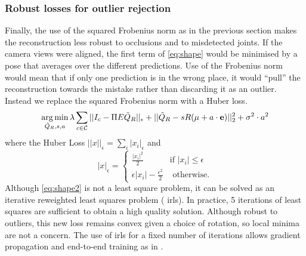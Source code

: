 \documentclass[10pt,twocolumn,letterpaper]{article}
\DeclareMathOperator*{\argmin}{arg\,min}
\newcommand{\rec}{Q}
\begin{document}
\subsubsection{Robust losses for outlier rejection}
Finally, the use of the squared Frobenius norm as in the previous section makes the
reconstruction less robust to occlusions and to misdetected joints. If the
camera views were aligned, the first term of \eqref{eq:shape} would be minimised
by a pose that averages over the different predictions. Use of the Frobenius
norm would  mean
that if only one prediction is in the wrong place, it would ``pull'' the
reconstruction towards the mistake rather than discarding it as an outlier.
Instead we replace the squared Frobenius norm with a Huber loss.
\begin{equation}
 \argmin_{\tilde\rec_R,s,a} \lambda \sum_{c\in \cal C} ||I_c -\Pi E \tilde\rec_R ||_\epsilon + ||\tilde\rec_R - s R (\mu + a \cdot {\bf e})||_2^2 +\sigma^2 \cdot a^2
 \label{eq:shape2}
\end{equation}
where the Huber Loss $||x||_\epsilon=\sum_i |x_i|_\epsilon$ and 
\begin{equation}
 |x|_\epsilon =\begin{cases}
 \frac{|x_i|^2}{2} &\text{if $|x_i|\leq \epsilon$}\\
 \epsilon |x_i| - \frac{\epsilon^2}{2}&\text{ otherwise.}
 \end{cases}
\end{equation}
Although \eqref{eq:shape2} is not  a least square
problem, it can be solved as an iterative reweighted least squares problem ({\sc
irls}). In
practice, 5 iterations of least squares are sufficient to obtain a high quality
solution. Although robust to outliers, this new loss remains convex given a
choice of rotation, so local
minima are not a concern. The use of {\sc irls} for a fixed number of iterations
allows gradient propagation and end-to-end training as in \cite{tome2017lifting}.   
\end{document}
